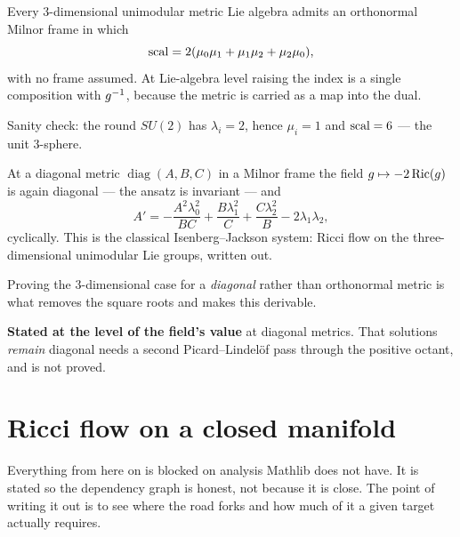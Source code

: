 \begin{theorem}
  \label{thm:milnor-scalar}
  \leanok
  Every $3$-dimensional unimodular metric Lie algebra admits an orthonormal
  Milnor frame in which
  \[ \operatorname{scal} = 2(\mu_0\mu_1 + \mu_1\mu_2 + \mu_2\mu_0), \]
  with no frame assumed. At Lie-algebra level raising the index is a single
  composition with $g^{-1}$, because the metric is carried as a map into the
  dual.

  Sanity check: the round $SU(2)$ has $\lambda_i = 2$, hence $\mu_i = 1$ and
  $\operatorname{scal} = 6$ --- the unit $3$-sphere.
\end{theorem}

\begin{theorem}
  \label{thm:isenberg-jackson}
  \leanok
  At a diagonal metric $\operatorname{diag}(A,B,C)$ in a Milnor frame the field
  $g \mapsto -2\operatorname{Ric}(g)$ is again diagonal --- the ansatz is invariant --- and
  \[ A' = -\frac{A^2\lambda_0^2}{BC} + \frac{B\lambda_1^2}{C}
          + \frac{C\lambda_2^2}{B} - 2\lambda_1\lambda_2, \]
  cyclically. This is the classical Isenberg--Jackson system: Ricci flow on the
  three-dimensional unimodular Lie groups, written out.

  Proving the $3$-dimensional case for a \emph{diagonal} rather than orthonormal
  metric is what removes the square roots and makes this derivable.

  \textbf{Stated at the level of the field's value} at diagonal metrics. That
  solutions \emph{remain} diagonal needs a second Picard--Lindel\"of pass
  through the positive octant, and is not proved.
\end{theorem}

\chapter{Ricci flow on a closed manifold}
\label{chap:flow}

Everything from here on is blocked on analysis Mathlib does not have. It is
stated so the dependency graph is honest, not because it is close. The point of
writing it out is to see where the road forks and how much of it a given
target actually requires.


